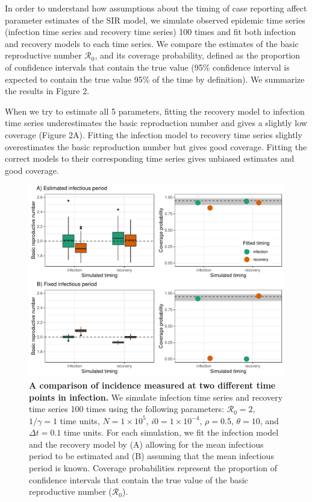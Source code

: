 \documentclass[12pt]{article}\usepackage[]{graphicx}\usepackage[]{color}
\begin{document}
In order to understand how assumptions about the timing of case reporting affect 
parameter estimates of the SIR model, we simulate observed epidemic time series
(infection time series and recovery time series) 
100 times and fit both infection and recovery models to each 
time series. We compare the estimates of the basic reproductive number $\mathcal R_0$,
and its coverage probability, defined as the proportion of confidence intervals that
contain the true value (95\% confidence interval is expected to contain the true value
95\% of the time by definition). We summarize the results in Figure 2.

When we try to estimate all 5 parameters, fitting the recovery model to
infection time series underestimates the basic reproduction number and 
gives a slightly low coverage (Figure 2A). Fitting the infection model to recovery
time series slightly overestimates the basic reproduction number but gives 
good coverage. Fitting the correct models to their corresponding time series
gives unbiased estimates and good coverage.

\begin{figure}
\includegraphics[width=\textwidth]{../figure/compare_deterministic.pdf}
\caption{
\textbf{A comparison of incidence measured at two different time points in infection.}
We simulate infection time series and recovery time series 100 times using the 
following parameters:  
$\mathcal R_0 = 2$, $1/\gamma = 1$ time units, $N = 1 \times 10^5$, $i0 = 1 \times 10^{-4}$,
$\rho = 0.5$, $\theta = 10$, and $\Delta t = 0.1$ time units.
For each simulation, we fit the infection model and the recovery model by
(A) allowing for the mean infectious period to be estimated and (B) assuming
that the mean infectious period is known.
Coverage probabilities represent the proportion of confidence intervals
that contain the true value of the basic reproductive number ($\mathcal R_0$).
}
\end{figure}
\end{document}
